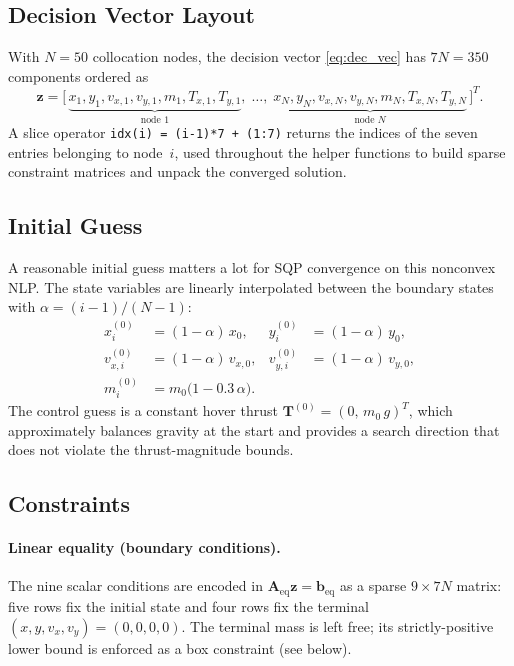 \documentclass[../main.tex]{subfiles}
\begin{document}
\subsection{Decision Vector Layout}

With $N = 50$ collocation nodes, the decision vector \eqref{eq:dec_vec} has $7N = 350$ components ordered as
\begin{equation}
    \mathbf{z} = \bigl[\,
    \underbrace{x_1, y_1, v_{x,1}, v_{y,1}, m_1, T_{x,1}, T_{y,1}}_{\text{node 1}},\;
    \ldots,\;
    \underbrace{x_N, y_N, v_{x,N}, v_{y,N}, m_N, T_{x,N}, T_{y,N}}_{\text{node }N}\,\bigr]^T.
\end{equation}
A slice operator \texttt{idx(i) = (i-1)*7 + (1:7)} returns the indices of the seven entries belonging to node~$i$, used throughout the helper functions to build sparse constraint matrices and unpack the converged solution.

\subsection{Initial Guess}\label{sec:initial_guess}

A reasonable initial guess matters a lot for SQP convergence on this nonconvex NLP. The state variables are linearly interpolated between the boundary states with $\alpha = (i-1)/(N-1)$:
\begin{align}
    x_i^{(0)}     &= (1-\alpha)\, x_0,
    & y_i^{(0)}   &= (1-\alpha)\, y_0,\\
    v_{x,i}^{(0)} &= (1-\alpha)\, v_{x,0},
    & v_{y,i}^{(0)} &= (1-\alpha)\, v_{y,0},\\
    m_i^{(0)}     &= m_0\bigl(1 - 0.3\,\alpha\bigr).
\end{align}
The control guess is a constant hover thrust $\mathbf{T}^{(0)} = (0,\, m_0\, g)^T$, which approximately balances gravity at the start and provides a search direction that does not violate the thrust-magnitude bounds.

\subsection{Constraints}

\paragraph{Linear equality (boundary conditions).} The nine scalar conditions are encoded in $\mathbf{A}_{\mathrm{eq}}\mathbf{z} = \mathbf{b}_{\mathrm{eq}}$ as a sparse $9 \times 7N$ matrix: five rows fix the initial state and four rows fix the terminal $(x, y, v_x, v_y) = (0,0,0,0)$. The terminal mass is left free; its strictly-positive lower bound is enforced as a box constraint (see below).
\end{document}
